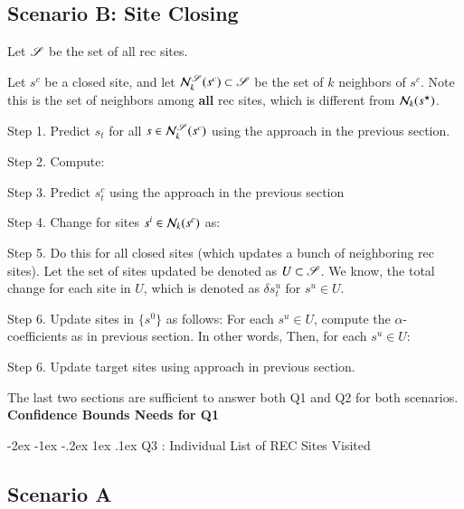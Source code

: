 \documentclass[onecolumn, compsoc,10pt]{IEEEtran}
\makeatletter
\renewcommand\section{\@startsection {section}{1}{\z@}%
  {-2ex \@plus -1ex \@minus -.2ex}%
  {1ex \@plus.1ex}%
  {\LARGE\bfseries\scshape}}
\makeatother
\begin{document}
\subsection{Scenario B: Site Closing}

Let $\S$ be the set of all rec sites.

Let $s^c$ be a closed site, and let $\N_k^\S(s^c) \subset \S$ be the set of $k$ neighbors of $s^c$. Note this is the set of neighbors among \textbf{all} rec sites, which is different from $\N_k(\ss)$.


Step 1. Predict $s_t$ for all $s \in \N_k^\S(s^c)$ using the approach in the previous section.

Step 2. Compute:

Step 3. Predict $s^c_t$ using the approach in the previous section

Step 4. Change for  sites  $s^i \in \N_k(s^c)$ as:

Step 5. Do this for all closed sites (which updates a bunch of neighboring rec sites). Let the set of sites updated be denoted as $U \subset \S$. We know, the total change for each site in $U$, which is denoted as $\delta s^u_t$ for $s^u \in U$.

Step 6. Update sites in $\{s^0\}$ as follows:
For each $s^u \in U$, compute the $\alpha$-coefficients as in previous section. In other words, 
Then, for each $s^u \in U$:

Step 6.  Update target sites using approach in previous section.


The last two sections are sufficient to answer both Q1 and Q2 for both scenarios. %
\textbf{Confidence Bounds Needs for Q1}

\section{Q3 : Individual List of REC Sites Visited}

\subsection{Scenario A}
\end{document}
